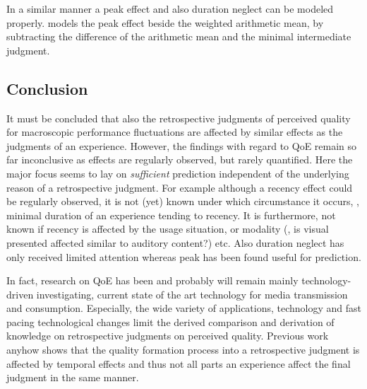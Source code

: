 In a similar manner a peak effect and also duration neglect can be modeled properly.
\cite{weiss_modeling_2009} models the peak effect beside the weighted arithmetic mean, by subtracting the difference of the arithmetic mean and the minimal intermediate judgment.


\subsection{Conclusion}
It must be concluded that also the retrospective judgments of perceived quality for macroscopic performance fluctuations are affected by similar effects as the judgments of an experience.
However, the findings with regard to \ac{QoE} remain so far inconclusive as effects are regularly observed, but rarely quantified.
Here the major focus seems to lay on \emph{sufficient} prediction independent of the underlying reason of a retrospective judgment.
For example although a recency effect could be regularly observed, it is not (yet) known under which circumstance it occurs, \eg, minimal duration of an experience tending to recency.
It is furthermore, not known if recency is affected by the usage situation, or modality (\eg, is visual presented affected similar to auditory content?) etc.
Also duration neglect has only received limited attention whereas peak has been found useful for prediction.

In fact, research on \ac{QoE} has been and probably will remain mainly technology-driven investigating, current state of the art technology for media transmission and consumption.
Especially, the wide variety of applications, technology and fast pacing technological changes limit the derived comparison and derivation of knowledge on retrospective judgments on perceived quality.
Previous work anyhow shows that the quality formation process into a retrospective judgment is affected by temporal effects and thus not all parts an experience affect the final judgment in the same manner.